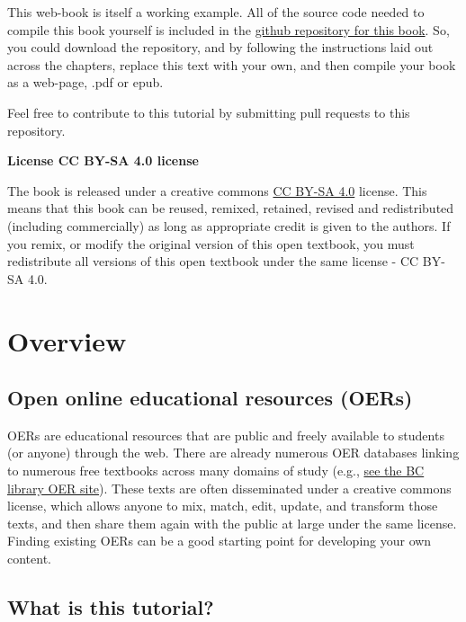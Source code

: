 \documentclass[
]{book}
\begin{document}
This web-book is itself a working example. All of the source code needed to compile this book yourself is included in the \href{https://github.com/CrumpLab/OER_bookdown}{github repository for this book}. So, you could download the repository, and by following the instructions laid out across the chapters, replace this text with your own, and then compile your book as a web-page, .pdf or epub.

Feel free to contribute to this tutorial by submitting pull requests to this repository.

\textbf{License CC BY-SA 4.0 license}

The book is released under a creative commons \href{https://creativecommons.org/licenses/by-sa/4.0/}{CC BY-SA 4.0} license. This means that this book can be reused, remixed, retained, revised and redistributed (including commercially) as long as appropriate credit is given to the authors. If you remix, or modify the original version of this open textbook, you must redistribute all versions of this open textbook under the same license - CC BY-SA 4.0.

\hypertarget{overview}{%
\chapter{Overview}\label{overview}}

\hypertarget{open-online-educational-resources-oers}{%
\section{Open online educational resources (OERs)}\label{open-online-educational-resources-oers}}

OERs are educational resources that are public and freely available to students (or anyone) through the web. There are already numerous OER databases linking to numerous free textbooks across many domains of study (e.g., \href{http://libguides.brooklyn.cuny.edu/research/oer}{see the BC library OER site}). These texts are often disseminated under a creative commons license, which allows anyone to mix, match, edit, update, and transform those texts, and then share them again with the public at large under the same license. Finding existing OERs can be a good starting point for developing your own content.

\hypertarget{what-is-this-tutorial}{%
\section{What is this tutorial?}\label{what-is-this-tutorial}}
\end{document}
